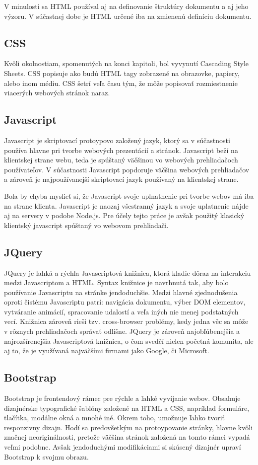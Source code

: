 V minulosti sa HTML používal aj na definovanie štruktúry dokumentu a aj jeho výzoru. V súčastnej dobe je HTML určené iba na zmienenú definíciu dokumentu.

\subsection{CSS}
Kvôli okolnostiam, spomenutých na konci kapitoli, bol vyvynutí Cascading Style Sheets. CSS popisuje ako budú HTML tagy zobrazené na obrazovke, papiery, alebo inom médiu. CSS šetrí veľa času tým, že môže popisovať rozmiestnenie viacerých webových stránok naraz.

\subsection{Javascript}
Javascript je skriptovací protoypovo založený jazyk, ktorý sa v súčastnosti používa hlavne pri tvorbe webových prezentácií a stránok. Javascript beží na klientskej strane webu, teda je spúštaný väčšinou vo webových prehliadačoch používateľov. V súčastnosti Javascript popdoruje väčšina webových prehliadačov a zároveň je najpoužívanejší skriptovací jazyk používaný na klientskej strane.

Bola by chyba myslieť si, že Javascript svoje uplnatnenie pri tvorbe webov má iba na strane klienta. Javascript je naozaj všestranný jazyk a svoje uplatnenie nájde aj na servery v podobe Node.js. Pre účely tejto práce je avšak použitý klasický klientský javascript spúštaný vo webovom prehliadači.


\subsection{JQuery}
JQuery je ľahká a rýchla Javascriptová knižnica, ktorá kladie dôraz na interakciu medzi Javascriptom a HTML. Syntax knižnice je navrhnutá tak, aby bolo používanie Javascriptu na stránke jendoduchšie. Medzi hlavné zjednodušenia oproti čistému Javascriptu patrí: navigácia dokumentu, výber DOM elementov, vytváranie animácií, spracovanie udalostí a veľa iných nie menej podstatných vecí. Knižnica zároveň rieši tzv. cross-browser problémy, kedy jedna věc sa môže v rôznych prehliadačoch správať odlišne.
JQuery je zároveň najobľúbenejšia a najrozšírenejšia Javascriptová knižnica, o čom svedčí nielen početná komunita, ale aj to, že je využívaná najväčšími firmami jako Google, či Microsoft.


\subsection{Bootstrap}
Bootstrap je frontendový rámec pre rýchle a ľahké vyvíjanie webov. Obsahuje dizajnérske typografické šablóny založené na HTML a CSS, napríklad formuláre, tlačítka, modálne okná a mnohé iné. Okrem toho, umožnuje ľahko tvoriť responzivny dizajn. Hodí sa predovšetkým na protoypovanie stránky, hlavne kvôli značnej neoriginálnosti, pretože väčšina stránok založená na tomto rámci vypadá veľmi podobne. Avšak jendoduchými   modifikáciami si skúsený dizajnér upraví Bootstrap k svojmu obrazu.  

